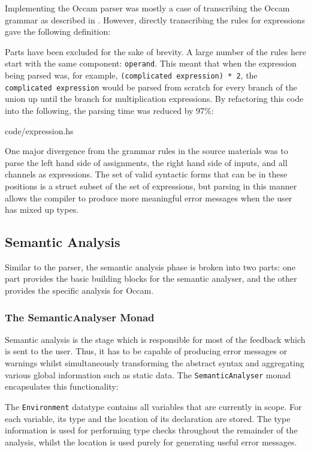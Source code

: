 Implementing the Occam parser was mostly a case of transcribing the Occam
grammar as described in \cite{jones}. However, directly transcribing the rules
for expressions gave the following definition:

Parts have been excluded for the sake of brevity. A large number of the rules
here start with the same component: \texttt{operand}. This meant that when the
expression being parsed was, for example, \texttt{(complicated expression) * 2},
the \texttt{complicated expression} would be parsed from scratch for every
branch of the union up until the branch for multiplication expressions. By
refactoring this code into the following, the parsing time was reduced by 97\%:

    {code/expression.hs}

One major divergence from the grammar rules in the source materials was to parse
the left hand side of assignments, the right hand side of inputs, and all
channels as expressions. The set of valid syntactic forms that can be in these
positions is a struct subset of the set of expressions, but parsing in this
manner allows the compiler to produce more meaningful error messages when the
user has mixed up types.

\subsection{Semantic Analysis}

Similar to the parser, the semantic analysis phase is broken into two parts: one
part provides the basic building blocks for the semantic analyser, and the other
provides the specific analysis for Occam.

\subsubsection{The SemanticAnalyser Monad}

Semantic analysis is the stage which is responsible for most of the feedback
which is sent to the user. Thus, it has to be capable of producing error
messages or warnings whilst simultaneously transforming the abstract syntax and
aggregating various global information such as static data. The
\texttt{SemanticAnalyser} monad encapsulates this functionality:

The \texttt{Environment} datatype contains all variables that are currently in
scope. For each variable, its type and the location of its declaration are
stored. The type information is used for performing type checks throughout the
remainder of the analysis, whilst the location is used purely for generating
useful error messages.

